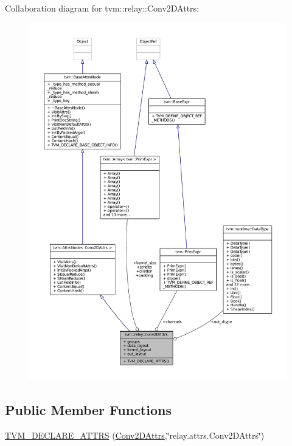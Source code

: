 Collaboration diagram for tvm\+:\+:relay\+:\+:Conv2\+D\+Attrs\+:
\nopagebreak
\begin{figure}[H]
\begin{center}
\leavevmode
\includegraphics[width=350pt]{structtvm_1_1relay_1_1Conv2DAttrs__coll__graph}
\end{center}
\end{figure}
\subsection*{Public Member Functions}
\begin{DoxyCompactItemize}
\item 
\hyperlink{structtvm_1_1relay_1_1Conv2DAttrs_aae0900ad831f433dfad37d51915af4bb}{T\+V\+M\+\_\+\+D\+E\+C\+L\+A\+R\+E\+\_\+\+A\+T\+T\+RS} (\hyperlink{structtvm_1_1relay_1_1Conv2DAttrs}{Conv2\+D\+Attrs},\char`\"{}relay.\+attrs.\+Conv2\+D\+Attrs\char`\"{})
\end{DoxyCompactItemize}
